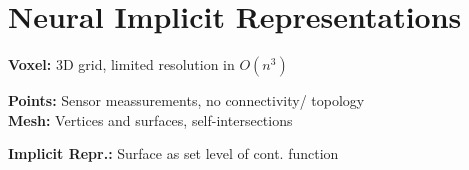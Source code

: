 \section{Neural Implicit Representations}

\textbf{Voxel:} 3D grid, limited resolution in $O(n^3)$\\

\textbf{Points:} Sensor meassurements, no connectivity/ topology\\

\textbf{Mesh:} Vertices and surfaces, self-intersections\\

\textbf{Implicit Repr.:} Surface as set level of cont. function\\

